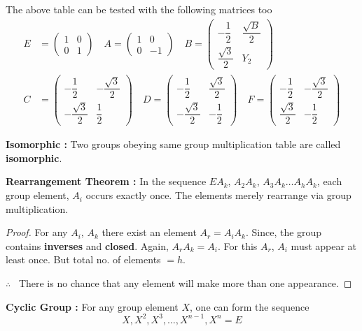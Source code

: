 \begin{example*}
The above table can be tested with the following matrices too
\begin{align*}
E &= \left(\begin{matrix} 1 & 0\\ 0 & 1\end{matrix}\right)\quad A=\left(\begin{matrix} 1 & 0 \\ 0 & -1\end{matrix}\right)\quad B=\left(\begin{matrix}-\dfrac{1}{2} & \dfrac{\sqrt{B}}{2}\\ \dfrac{\sqrt{3}}{2} & Y_{2}\end{matrix}\right)\\[5pt]
C &= \left(\begin{matrix} -\dfrac{1}{2} & -\dfrac{\sqrt{3}}{2}\\ -\dfrac{\sqrt{3}}{2} & \dfrac{1}{2}\end{matrix}\right)\quad D= \left(\begin{matrix} -\dfrac{1}{2} & \dfrac{\sqrt{3}}{2}\\ -\dfrac{\sqrt{3}}{2} & -\dfrac{1}{2}\end{matrix}\right)\quad F= \left(\begin{matrix}-\dfrac{1}{2} & -\dfrac{\sqrt{3}}{2}\\ \dfrac{\sqrt{3}}{2} & -\dfrac{1}{2}\end{matrix}\right)
\end{align*}
\end{example*}

\noindent
{\bf Isomorphic :} Two groups obeying same group multiplication table are called {\bf isomorphic}.

\noindent
{\bf Rearrangement Theorem :} In the sequence $EA_{k}$, $A_{2}A_{k}$, $A_{3}A_{k}\ldots A_{h}A_{k}$, each group element, $A_{i}$ occurs exactly once. The elements merely rearrange via group multiplication.

\begin{proof}
For any $A_{i}$, $A_{k}$ there exist an element $A_{r}=A_{i}A_{k}$. Since, the group contains {\bf inverses} and {\bf closed}. Again, $A_{r}A_{k}=A_{i}$. For this $A_{r}$, $A_{i}$ must appear at least once. But total no. of elements $=h$.

$\therefore$ \ There is no chance that any element will make more than one appearance.
\end{proof}

\noindent
{\bf Cyclic Group :} For any group element $X$, one can form the sequence
$$
X,X^{2},X^{3},\ldots,X^{n-1},X^{n}=E
$$

